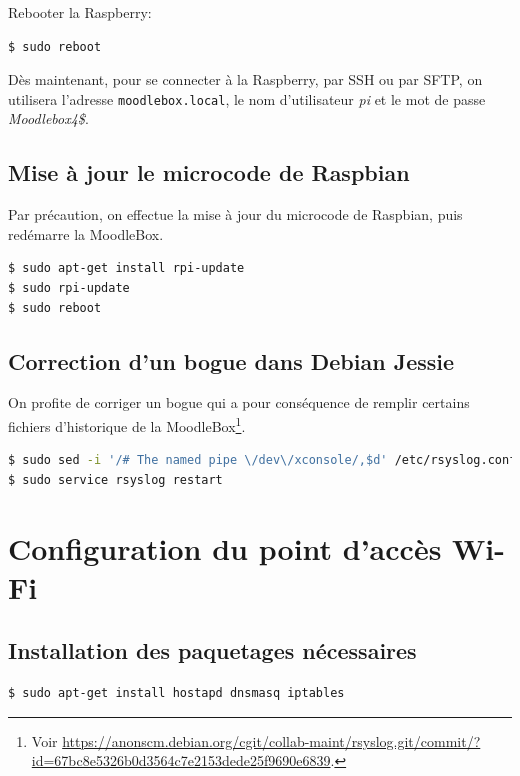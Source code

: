 \documentclass[11pt]{article}
\begin{document}
Rebooter la Raspberry:
\begin{lstlisting}[language=bash]
$ sudo reboot
\end{lstlisting}

Dès maintenant, pour se connecter à la Raspberry, par SSH ou par SFTP, on utilisera l'adresse \lstinline{moodlebox.local}, le nom d'utilisateur \emph{pi} et le mot de passe \emph{Moodlebox4\$}.

\subsection{Mise à jour le microcode de Raspbian}

Par précaution, on effectue la mise à jour du microcode de Raspbian, puis redémarre la MoodleBox.

\begin{lstlisting}[language=bash]
$ sudo apt-get install rpi-update
$ sudo rpi-update
$ sudo reboot
\end{lstlisting}

\subsection{Correction d'un bogue dans Debian Jessie}

On profite de corriger un bogue qui a pour conséquence de remplir certains fichiers d'historique de la MoodleBox\footnote{Voir \url{https://anonscm.debian.org/cgit/collab-maint/rsyslog.git/commit/?id=67bc8e5326b0d3564c7e2153dede25f9690e6839}.}.

\begin{lstlisting}[language=bash]
$ sudo sed -i '/# The named pipe \/dev\/xconsole/,$d' /etc/rsyslog.conf
$ sudo service rsyslog restart
\end{lstlisting}

\section{Configuration du point d'accès Wi-Fi}

\subsection{Installation des paquetages nécessaires}

\begin{lstlisting}[language=bash]
$ sudo apt-get install hostapd dnsmasq iptables
\end{lstlisting}
\end{document}
